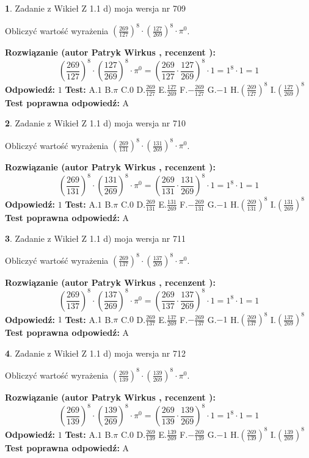 \documentclass[12pt, a4paper]{article}
\theoremstyle{definition} %
\newtheorem{zad}{}
\newcommand{\zadStart}[1]{\begin{zad}#1\newline}
\newcommand{\zadStop}{\end{zad}}
\newcommand{\rozwStart}[2]{\noindent \textbf{Rozwiązanie (autor #1 , recenzent #2): }\newline}
\newcommand{\rozwStop}{\newline}
\newcommand{\odpStart}{\noindent \textbf{Odpowiedź:}\newline}
\newcommand{\odpStop}{\newline}
\newcommand{\testStart}{\noindent \textbf{Test:}\newline}
\newcommand{\testStop}{\newline}
\newcommand{\kluczStart}{\noindent \textbf{Test poprawna odpowiedź:}\newline}
\newcommand{\kluczStop}{\newline}
\begin{document}
\zadStart{Zadanie z Wikieł Z 1.1 d) moja wersja nr 709}

Obliczyć wartość wyrażenia $(\frac{269}{127})^{8} \cdot (\frac{127}{269})^{8} \cdot \pi^{0}$.
\zadStop
\rozwStart{Patryk Wirkus}{}
$$(\frac{269}{127})^{8} \cdot (\frac{127}{269})^{8} \cdot \pi^{0} = (\frac{269}{127} \cdot \frac{127}{269})^{8} \cdot 1 = 1^{8} \cdot 1 = 1$$
\rozwStop
\odpStart
$1$
\odpStop
\testStart
A.$1$ B.$\pi$ C.$0$ D.$\frac{269}{127}$ E.$\frac{127}{269}$
F.$-\frac{269}{127}$ G.$-1$
H.$(\frac{269}{127})^{8}$
I.$(\frac{127}{269})^{8}$
\testStop
\kluczStart
A
\kluczStop



\zadStart{Zadanie z Wikieł Z 1.1 d) moja wersja nr 710}

Obliczyć wartość wyrażenia $(\frac{269}{131})^{8} \cdot (\frac{131}{269})^{8} \cdot \pi^{0}$.
\zadStop
\rozwStart{Patryk Wirkus}{}
$$(\frac{269}{131})^{8} \cdot (\frac{131}{269})^{8} \cdot \pi^{0} = (\frac{269}{131} \cdot \frac{131}{269})^{8} \cdot 1 = 1^{8} \cdot 1 = 1$$
\rozwStop
\odpStart
$1$
\odpStop
\testStart
A.$1$ B.$\pi$ C.$0$ D.$\frac{269}{131}$ E.$\frac{131}{269}$
F.$-\frac{269}{131}$ G.$-1$
H.$(\frac{269}{131})^{8}$
I.$(\frac{131}{269})^{8}$
\testStop
\kluczStart
A
\kluczStop



\zadStart{Zadanie z Wikieł Z 1.1 d) moja wersja nr 711}

Obliczyć wartość wyrażenia $(\frac{269}{137})^{8} \cdot (\frac{137}{269})^{8} \cdot \pi^{0}$.
\zadStop
\rozwStart{Patryk Wirkus}{}
$$(\frac{269}{137})^{8} \cdot (\frac{137}{269})^{8} \cdot \pi^{0} = (\frac{269}{137} \cdot \frac{137}{269})^{8} \cdot 1 = 1^{8} \cdot 1 = 1$$
\rozwStop
\odpStart
$1$
\odpStop
\testStart
A.$1$ B.$\pi$ C.$0$ D.$\frac{269}{137}$ E.$\frac{137}{269}$
F.$-\frac{269}{137}$ G.$-1$
H.$(\frac{269}{137})^{8}$
I.$(\frac{137}{269})^{8}$
\testStop
\kluczStart
A
\kluczStop



\zadStart{Zadanie z Wikieł Z 1.1 d) moja wersja nr 712}

Obliczyć wartość wyrażenia $(\frac{269}{139})^{8} \cdot (\frac{139}{269})^{8} \cdot \pi^{0}$.
\zadStop
\rozwStart{Patryk Wirkus}{}
$$(\frac{269}{139})^{8} \cdot (\frac{139}{269})^{8} \cdot \pi^{0} = (\frac{269}{139} \cdot \frac{139}{269})^{8} \cdot 1 = 1^{8} \cdot 1 = 1$$
\rozwStop
\odpStart
$1$
\odpStop
\testStart
A.$1$ B.$\pi$ C.$0$ D.$\frac{269}{139}$ E.$\frac{139}{269}$
F.$-\frac{269}{139}$ G.$-1$
H.$(\frac{269}{139})^{8}$
I.$(\frac{139}{269})^{8}$
\testStop
\kluczStart
A
\kluczStop
\end{document}
